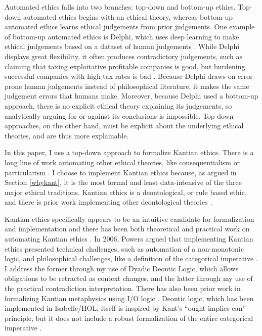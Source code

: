 \begin{isabellebody}
\begin{isamarkuptext}
Automated ethics falls into two branches: top-down and bottom-up ethics. Top-down automated ethics begins 
with an ethical theory, whereas bottom-up automated ethics learns ethical judgements from prior 
judgements. One example of bottom-up automated ethics is Delphi, which uses deep learning to make 
ethical judgements based on a dataset of human judgements \citep{delphi}. While Delphi displays great 
flexibility, it often produces contradictory judgements, such as claiming that taxing exploitative 
profitable companies is good, but burdening successful companies with high tax rates is bad \citep{verge}. 
Because Delphi draws on error-prone human judgements instead of philosophical literature, it makes 
the same judgement errors that humans make. Moreover, because Delphi used a bottom-up approach, 
there is no explicit ethical theory explaining its judgements, so analytically arguing for or 
against its conclusions is impossible. Top-down approaches, on the other hand, must be explicit about 
the underlying ethical theories, and are thus more explainable. 

In this paper, I use a top-down approach to formalize Kantian ethics. There is a long line of work 
automating other ethical theories, like consequentialism \citep{util1, util2} or particularism 
\citep{particularism1, particularism2}. I choose to implement Kantian ethics because, as argued in 
Section \ref{whykant}, it is the most formal and least data-intensive of the three major ethical 
traditions. Kantian ethics is a deontological, or rule based ethic, and there is prior work 
implementing other deontological theories \citep{dde, deon1, deon2}. 

Kantian ethics specifically appears to be an intuitive candidate for formalization and implementation 
and there has been both theoretical and practical work on automating Kantian ethics \citep{powers, lin}. 
In 2006, Powers argued that implementing Kantian ethics presented technical challenges, 
such as automation of a non-monotonic logic, and philosophical challenges, like a definition of the 
categorical imperative \citep{powers}. I address the former through my use of Dyadic Deontic Logic, which allows 
obligations to be retracted as context changes, and the latter through my use of the practical 
contradiction interpretation. There has also been prior work in formalizing Kantian metaphysics 
using I/O logic \citep{io}. Deontic logic, which has been implemented in Isabelle/HOL, itself is inspired 
by Kant's ``ought implies can'' principle, but it does not include a robust formalization of the entire 
categorical imperative \citep{cresswell}.


\end{isamarkuptext}
\end{isabellebody}
